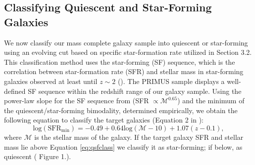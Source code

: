 \documentclass{emulateapj}
\begin{document}
\subsection{Classifying Quiescent and Star-Forming Galaxies} \label{sec:sfq}
We now classify our mass complete galaxy sample into quiescent or star-forming using an evolving cut based on specific star-formation rate utilized in \cite{Moustakas:2013aa} Section 3.2. This classification method uses the star-forming (SF) sequence, which is the correlation between star-formation rate (SFR) and stellar mass in star-forming galaxies observed at least until $z \sim 2$ (\citealt{Noeske:2007aa, Williams:2009aa, Karim:2011aa}). The PRIMUS sample displays a well-defined SF sequence within the redshift range of our galaxy sample. Using the power-law slope for the SF sequence from \cite{Salim:2007aa} (SFR $\propto \mathcal{M}^{0.65}$) and the minimum of the quiescent/star-forming bimodality, determined empirically, we obtain the following equation to classify the target galaxies (Equation 2 in \citealt{Moustakas:2013aa}):
\begin{equation} \label{eq:qsfclass} 
\mathrm{log}(\mathrm{SFR}_{\mathrm{min}}) = -0.49 + 0.64 \mathrm{log}(\mathcal{M} - 10) +1.07(z-0.1), 
\end{equation} 
where $\mathcal{M}$ is the stellar mass of the galaxy. If the target galaxy SFR and stellar mass lie above Equation \ref{eq:qsfclass} we classify it as star-forming; if below, as quiescent (\citealt{Moustakas:2013aa} Figure 1.).
\end{document}
